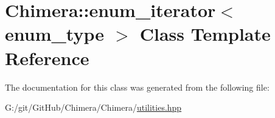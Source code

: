 \hypertarget{class_chimera_1_1enum__iterator}{}\section{Chimera\+:\+:enum\+\_\+iterator$<$ enum\+\_\+type $>$ Class Template Reference}
\label{class_chimera_1_1enum__iterator}


The documentation for this class was generated from the following file\+:\begin{DoxyCompactItemize}
\item 
G\+:/git/\+Git\+Hub/\+Chimera/\+Chimera/\mbox{\hyperlink{utilities_8hpp}{utilities.\+hpp}}\end{DoxyCompactItemize}
